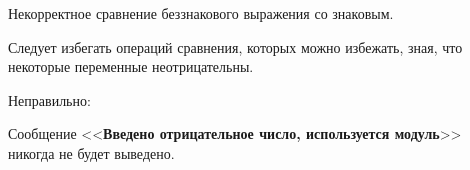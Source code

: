 \begin{typerror}
	Некорректное сравнение беззнакового выражения со знаковым.

	Следует избегать операций сравнения, которых можно избежать, зная, что некоторые переменные неотрицательны.



	Неправильно:

	Сообщение <<\textbf{Введено отрицательное число, используется модуль}>> никогда не будет выведено.

	
\end{typerror}
